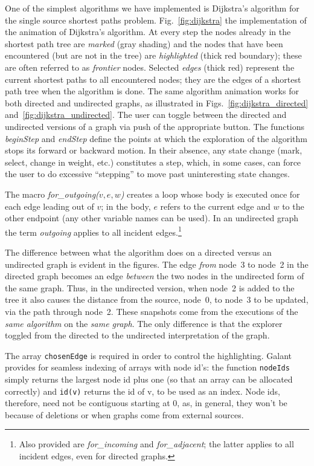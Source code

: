 One of the simplest algorithms we have implemented is Dijkstra's algorithm
for the single source shortest paths problem.
Fig.~\ref{fig:dijkstra}
the implementation of the animation of Dijkstra's algorithm.
At every step the nodes already in the shortest path tree are \emph{marked}
(gray shading) and the nodes that have been encountered (but are not in the tree)
are \emph{highlighted} (thick red boundary); these are often referred to as
\emph{frontier} nodes.
Selected \emph{edges} (thick red) represent the current shortest paths to all
encountered nodes;
they are the edges of a shortest path tree when the algorithm is done.
The same algorithm animation
works for both directed and undirected graphs, as illustrated
in Figs.~\ref{fig:dijkstra_directed} and~\ref{fig:dijkstra_undirected}.
The user can toggle between the directed and undirected versions of a graph
via push of the appropriate button.
The functions \emph{beginStep} and \emph{endStep} define the points at which
the exploration of the algorithm stops its forward or backward motion.
In their absence, any state change (mark, select, change in weight, etc.)
constitutes a step, which, in some cases, can force the user
to do excessive ``stepping'' to move past uninteresting state changes.







The macro \emph{for\_outgoing($v,e,w$)}
creates a loop whose body is executed once
for each edge leading out of $v$; in the body, $e$ refers to the current edge
and $w$ to the other endpoint (any other variable names can be used).
In an undirected graph the term \emph{outgoing} applies to all incident
edges.\footnote{
Also provided are \emph{for\_incoming} and \emph{for\_adjacent};
the latter applies to all incident edges, even for directed graphs.
}

The difference between what the algorithm does on a directed versus an undirected graph is evident in the figures.
The edge \emph{from} node~3 to node~2 in the directed graph becomes an
edge \emph{between} the two nodes in the undirected form of the same graph.
Thus, in the undirected version, when node~2 is added to the tree
it also causes the distance from the source, node~0, to node~3 to be updated,
via the path through node~2.
These snapshots come from the executions of the \emph{same algorithm} on the
\emph{same graph}.
The only difference is that the explorer toggled from the directed to
the undirected
interpretation of the graph.

The array \verb+chosenEdge+ is required in order to control the highlighting.
Galant provides for seamless indexing of arrays with node id's: the
function \verb+nodeIds+ simply returns the largest node id plus one
(so that an array can be allocated correctly) and \verb+id(v)+ returns the
id of v, to be used as an index.
Node ids, therefore, need not be contiguous starting at 0, as,
in general, they won't be because of deletions or when graphs
come from external sources.
